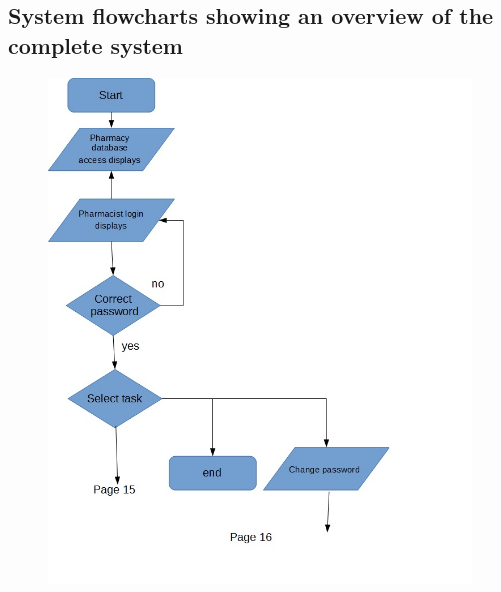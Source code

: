 \subsection{System flowcharts showing an overview of the complete system}
\begin{figure}[H]
\centering
\includegraphics[width=140mm, scale=2]{system flow 1.JPG}
\end{figure}
